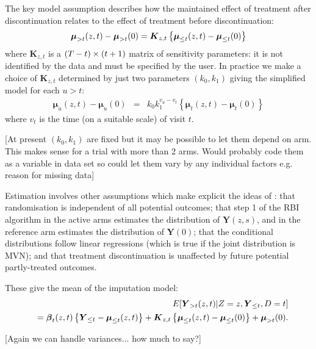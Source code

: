 The key model assumption describes how the maintained effect of treatment after
discontinuation relates to the effect of treatment before discontinuation:
\begin{equation}\label{eq:del}
\boldsymbol{\mu}_{{>t}}(z,t)-\boldsymbol{\mu}_{{>t}}(0) =
\boldsymbol{K}_{z,t} \left\{\boldsymbol{\mu}_{{\le{t}}}(z,t)-\boldsymbol{\mu}_{{\le{t}}}(0)\right\}
\end{equation}
where $\boldsymbol{K}_{z,t}$ is a $(T - t) \times (t+1)$ matrix of sensitivity parameters: it is not
identified by the data and must be specified by the user.
In practice we make a choice of $\boldsymbol{K}_{z,t}$ determined by just two parameters $(k_0,k_1)$ giving the simplified model for each $u>t$:
\begin{eqnarray}
\boldsymbol{\mu}_u(z,t) - \boldsymbol{\mu}_u(0)  & =& k_0 k_1^{v_u-v_t} \left\{ \boldsymbol{\mu}_t(z,t) - \boldsymbol{\mu}_t(0) \right\} \label{eq:mte3}
\end{eqnarray}
where  $v_t$ is the time (on a suitable scale) of visit $t$.

[At present $(k_0, k_1)$ are fixed but it may be possible to let them depend on arm. 
This makes sense for a trial with more than 2 arms. 
Would probably code them as a variable in data set so could let them vary by any individual factors e.g. reason for missing data]

Estimation involves other assumptions which make explicit the ideas of \citet{Carpenter++13}: 
that randomisation is independent of all potential outcomes; 
that step 1 of the RBI algorithm in the active arms estimates the distribution of $\boldsymbol{Y}(z,s)$,
and in the reference arm estimates the distribution of $\boldsymbol{Y}(0)$; 
that the conditional distributions follow linear regressions (which is true if the joint distribution is MVN); 
and that treatment discontinuation is unaffected by future potential partly-treated outcomes.

These give the mean of the imputation model:
\begin{eqnarray}\label{eq:causal}
&&E[\boldsymbol{Y}_{{>t}}(z,t) | Z=z, \boldsymbol{Y}_{{\le{t}}}, D=t]
\nonumber\\
&&=
\boldsymbol{\beta}_{t}(z,t) \left\{\boldsymbol{Y}_{{\le{t}}} - \boldsymbol{\mu}_{{\le{t}}}(z,t)\right\}  +
\boldsymbol{K}_{z,t} \left\{\boldsymbol{\mu}_{{\le{t}}}(z,t)-\boldsymbol{\mu}_{{\le{t}}}(0)\right\} +
\boldsymbol{\mu}_{{>t}}(0).
\end{eqnarray}

[Again we can handle variances... how much to say?]


